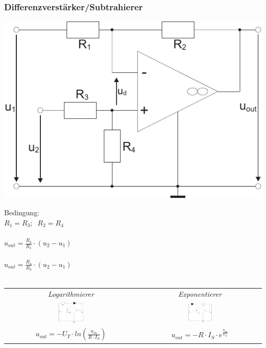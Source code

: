 \documentclass[a4paper,twocolumn,10pt]{article}
\begin{document}
\subsubsection*{Differenzverstärker/Subtrahierer}
\begin{minipage}[b]{0.25\textwidth}
\includegraphics[width=\textwidth]{img/OP_PDiffV}
\end{minipage}
\hfill
\begin{minipage}[b]{0.2\textwidth}
Bedingung:\\
$R_1=R_3;\;\;R_2=R_4$\\\\
$u_{out}=\frac{R_2}{R_1}\cdot (u_2-u_1)$\\\\
$u_{out}=\frac{R_4}{R_3}\cdot (u_2-u_1)$\\\\
\end{minipage}

\begin{tabular}{c|c}
	\emph{Logarithmierer} & \emph{Exponentierer}\\
	\includegraphics[width=0.2\textwidth]{img/OP_Log} & \includegraphics[width=0.2\textwidth]{img/OP_Exp}\\
	$u_{out}=-U_T\cdot ln(\frac{u_{in}}{R\cdot I_S})$ & 
	$u_{out}=-R\cdot I_S\cdot e^{\frac{u_{in}}{U_T}}$
\end{tabular}
\end{document}
